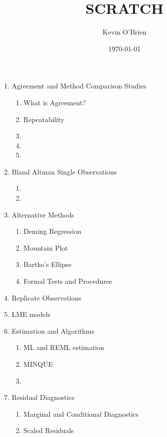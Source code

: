 \documentclass[12pt, a4paper]{report}
\begin{document}
\author{Kevin O'Brien}
\title{SCRATCH}
\date{\today}
\maketitle

\tableofcontents \setcounter{tocdepth}{2}

\begin{enumerate}
	\item Agreement and Method Comparison Studies
	\begin{enumerate}
		\item What is Agreement?
		\item Repeatability
		\item
		\item
		\item
	\end{enumerate}
	\item Bland Altman Single Observations
	\begin{enumerate}
		\item
		\item
	\end{enumerate}
	\item Alternative Methods
	\begin{enumerate}
		\item Deming Regression
		\item Mountain Plot
		\item Bartko's Ellipse
		\item Formal Tests and Procedures
	\end{enumerate}
	\item Replicate Observations
	
	\item LME models
	
	\item Estimation and Algorithms
	\begin{enumerate}
		\item ML and REML estimation
		\item MINQUE
		\item
	\end{enumerate}
	\item Residual Diagnostics
	\begin{enumerate}
		\item Marginal and Conditional Diagnostics
		\item Scaled Residuals
	\end{enumerate}
	

\end{enumerate}
\end{document}
